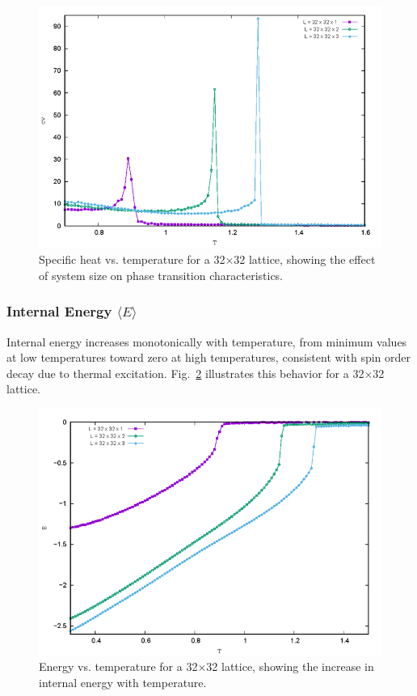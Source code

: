 \documentclass[conference, compsoc, twoside]{IEEEtran}
\begin{document}
\begin{figure}[t]
    \centering
    \includegraphics[width=0.9\columnwidth]{Gambar 21. Cv vs T pada Kisi 32 x 32.png}
    \caption{Specific heat vs. temperature for a 32×32 lattice, showing the effect of system size on phase transition characteristics.}
    \label{fig:cv_32x32}
\end{figure}

\subsubsection{Internal Energy $\langle E \rangle$}

Internal energy increases monotonically with temperature, from minimum values at low temperatures toward zero at high temperatures, consistent with spin order decay due to thermal excitation. Fig.~\ref{fig:e_32x32} illustrates this behavior for a 32×32 lattice.

\begin{figure}[t]
    \centering
    \includegraphics[width=0.9\columnwidth]{Gambar 29. E vs T pada Kisi 32x32.png}
    \caption{Energy vs. temperature for a 32×32 lattice, showing the increase in internal energy with temperature.}
    \label{fig:e_32x32}
\end{figure}
\end{document}
